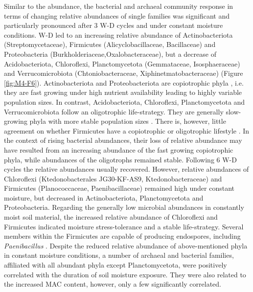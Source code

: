 Similar to the abundance, the bacterial and archaeal community response in terms of changing relative abundances of single families was significant and particularly pronounced after 3 W-D cycles and under constant moisture conditions. W-D led to an increasing relative abundance of Actinobacteriota (Streptomycetaceae), Firmicutes (Alicyclobacillaceae, Bacillaceae) and Proteobacteria (Burkholderiaceae,Oxalobacteraceae), but a decrease of Acidobacteriota, Chloroflexi, Planctomycetota (Gemmataceae, Isosphaeraceae) and Verrucomicrobiota (Chtoniobacteraceae, Xiphinetmatobacteraceae) (Figure \ref{fig:M4-F6}). Actinobacteriota and Proteobacteriota are copiotrophic phyla \citep{Finn2021, Li2021}, i.e. they are fast growing under high nutrient availability leading to highly variable population sizes. In contrast, Acidobacteriota, Chloroflexi, Planctomycetota and Verrucomicrobiota follow an oligotrophic life-strategy. They are generally slow-growing phyla with more stable population sizes \citep{Barnard2013, DelgadoBaquerizo2017a}. There is, however, little agreement on whether Firmicutes have a copiotrophic or oligotrophic lifestyle \citep{Schostag2019}. In the context of rising bacterial abundances, their loss of relative abundance may have resulted from an increasing abundance of the fast growing copiotrophic phyla, while abundances of the oligotrophs remained stable. Following 6 W-D cycles the relative abundances usually recovered. However, relative abundances of Chloroflexi (Ktedonobacterales JG30-KF-AS9, Ktedonobacteraceae) and Firmicutes (Planococcaceae, Paenibacillaceae) remained high under constant moisture, but decreased in Actinobacteriota, Planctomycetota and Proteobacteria. Regarding the generally low microbial abundances in constantly moist soil material, the increased relative abundance of Chloroflexi and Firmicutes indicated moisture stress-tolerance and a stable life-strategy. Several members within the Firmicutes are capable of producing endospores, including \textit{Paenibacillus} \citep{Paredes2005, Schostag2019}. Despite the reduced relative abundance of above-mentioned phyla in constant moisture conditions, a number of archaeal and bacterial families, affiliated with all abundant phyla except Planctomycetota, were positively correlated with the duration of soil moisture exposure. They were also related to the increased MAC content, however, only a few significantly correlated.

